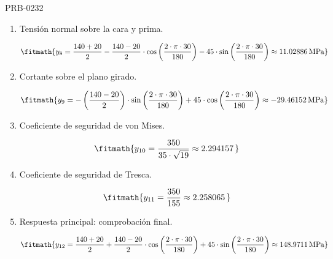\begin{studiumworked}{PRB-0232}
\begin{enumerate}
\[\fitmath{y_{7}=\frac{140+20}{2}+\frac{140-20}{2}\cdot \cos\left(\frac{2\cdot \pi\cdot 30}{180}\right)+45\cdot \sin\left(\frac{2\cdot \pi\cdot 30}{180}\right)\approx 148.9711\,\mathrm{MPa}}\]

\item Tensión normal sobre la cara y prima.

\[\fitmath{y_{8}=\frac{140+20}{2}-\frac{140-20}{2}\cdot \cos\left(\frac{2\cdot \pi\cdot 30}{180}\right)-45\cdot \sin\left(\frac{2\cdot \pi\cdot 30}{180}\right)\approx 11.02886\,\mathrm{MPa}}\]

\item Cortante sobre el plano girado.

\[\fitmath{y_{9}=-\left(\frac{140-20}{2}\right)\cdot \sin\left(\frac{2\cdot \pi\cdot 30}{180}\right)+45\cdot \cos\left(\frac{2\cdot \pi\cdot 30}{180}\right)\approx -29.46152\,\mathrm{MPa}}\]

\item Coeficiente de seguridad de von Mises.

\[\fitmath{y_{10}=\frac{350}{35\cdot \sqrt{19}}\approx 2.294157\,}\]

\item Coeficiente de seguridad de Tresca.

\[\fitmath{y_{11}=\frac{350}{155}\approx 2.258065\,}\]

\item Respuesta principal: comprobación final.

\[\fitmath{y_{12}=\frac{140+20}{2}+\frac{140-20}{2}\cdot \cos\left(\frac{2\cdot \pi\cdot 30}{180}\right)+45\cdot \sin\left(\frac{2\cdot \pi\cdot 30}{180}\right)\approx 148.9711\,\mathrm{MPa}}\]

\end{enumerate}


\end{studiumworked}
